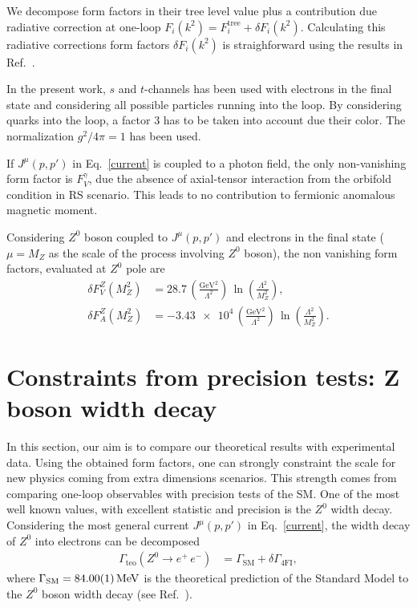 \documentclass[twocolumn,showpacs,showkeys,prd,superscriptaddress]{revtex4-1}
\begin{document}
We decompose form factors in their tree level value plus a contribution due radiative correction at one-loop $F_i(k^2) = F_i^{\text{tree}} + \delta F_i(k^2)$. Calculating this radiative corrections form factors $\delta F_i(k^2)$ is straighforward using the results  in Ref.~\cite{GonzalezGarcia:1998ay}.

In the present work, $s$ and $t$-channels has been used with electrons in the final state and considering all possible particles running into the loop. By considering quarks into the loop, a factor $3$ has to be taken into account due their color. The normalization $g^2/4\pi = 1$ has been used.

If $J^\mu(p,p')$ in Eq.~\eqref{current} is coupled to a photon field, the only non-vanishing form factor is $F_V^\gamma$, due the absence of axial-tensor interaction from the orbifold condition in RS scenario. This leads to no contribution to fermionic anomalous magnetic moment.

Considering $Z^0$ boson coupled to $J^\mu(p,p')$ and electrons in the final state ($\mu = M_Z$ as the scale of the process involving $Z^0$ boson), the non vanishing form factors, evaluated at $Z^0$ pole are  
\begin{align}
  \delta F_V^Z(M_Z^2) &= \num{28.7} \, \left(\frac{\si{\GeV}^2}{\Lambda^2}\right)\,\ln\left(\frac{\Lambda^2}{M_Z^2}\right), \\
  \delta F_A^Z(M_Z^2) &= -\num{3.43e4} \, \left(\frac{\si{\GeV}^2}{\Lambda^2}\right)\,\ln\left(\frac{\Lambda^2}{M_Z^2}\right).
\end{align}


\section{\label{sec:constraints}Constraints from precision tests: Z boson width decay}

In this section, our aim is to compare our theoretical results with experimental data. Using the obtained form factors, one can strongly constraint the scale for new physics coming from extra dimensions scenarios. This strength comes from comparing one-loop observables with precision tests of the SM. One of the most well known values, with excellent statistic and precision is the $Z^0$ width decay. Considering the most general current $J^\mu(p,p')$ in Eq.~\eqref{current}, the width decay of $Z^0$ into electrons can be decomposed
\begin{align}
  \Gamma_{\text{teo}}\left(Z^0\rightarrow e^+\,e^-\right) &= \Gamma_{\text{SM}} + \delta\Gamma_{\text{4FI}} ,
\end{align}
where $\Gamma_{\text{SM}} = \SI{84.00 \pm 0.01}{\MeV}$ is the theoretical prediction of the Standard Model to the $Z^0$ boson width decay (see Ref.~\cite{Beringer:1900zz}).
\end{document}
